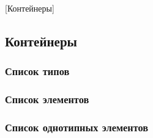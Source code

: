 [Контейнеры]


\subsection{Контейнеры}

\subsubsection{Список типов}

\subsubsection{Список элементов}

\subsubsection{Список однотипных элементов}
